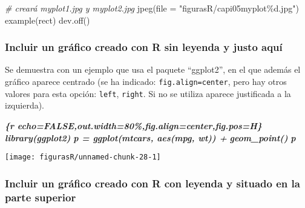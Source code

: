 \documentclass[12pt,a4paper,]{book}
\newenvironment{Shaded}{\begin{snugshade}}{\end{snugshade}}
\newcommand{\AttributeTok}[1]{\textcolor[rgb]{0.77,0.63,0.00}{#1}}
\newcommand{\CommentTok}[1]{\textcolor[rgb]{0.56,0.35,0.01}{\textit{#1}}}
\newcommand{\FunctionTok}[1]{\textcolor[rgb]{0.00,0.00,0.00}{#1}}
\newcommand{\InformationTok}[1]{\textcolor[rgb]{0.56,0.35,0.01}{\textbf{\textit{#1}}}}
\newcommand{\NormalTok}[1]{#1}
\newcommand{\StringTok}[1]{\textcolor[rgb]{0.31,0.60,0.02}{#1}}
\numberwithin{dummy}{section}
\theoremstyle{ocrenumbox}
\theoremstyle{blacknumex}
\theoremstyle{blacknumbox}
\theoremstyle{ocrenum}
\theoremstyle{ocrenum}
\begin{document}
\begin{Shaded}
\begin{Highlighting}[]
 \CommentTok{\# creará myplot1.jpg y myplot2.jpg}
\FunctionTok{jpeg}\NormalTok{(}\AttributeTok{file =} \StringTok{"figurasR/capi05myplot\%d.jpg"}\NormalTok{)}
\FunctionTok{example}\NormalTok{(rect)}
\FunctionTok{dev.off}\NormalTok{()}
\end{Highlighting}
\end{Shaded}

\hypertarget{incluir-un-gruxe1fico-creado-con-r-sin-leyenda-y-justo-aquuxed}{%
\subsubsection{Incluir un gráfico creado con R sin leyenda y justo
aquí}\label{incluir-un-gruxe1fico-creado-con-r-sin-leyenda-y-justo-aquuxed}}

Se demuestra con un ejemplo que usa el paquete ``ggplot2'', en el que
además el gráfico aparece centrado (se ha indicado:
\texttt{fig.align=\textquotesingle{}center\textquotesingle{}}, pero hay
otros valores para esta opción:
\texttt{\textquotesingle{}left\textquotesingle{}},
\texttt{\textquotesingle{}right\textquotesingle{}}. Si no se utiliza
aparece justificada a la izquierda).

\begin{Shaded}
\begin{Highlighting}[]
\InformationTok{\textasciigrave{}\textasciigrave{}\textasciigrave{}\{r echo=FALSE,out.width=\textquotesingle{}80\%\textquotesingle{},fig.align=\textquotesingle{}center\textquotesingle{},fig.pos=\textquotesingle{}H\textquotesingle{}\}}
\InformationTok{library(ggplot2)}
\InformationTok{p = ggplot(mtcars, aes(mpg, wt)) + }
\InformationTok{  geom\_point()}
\InformationTok{p  }
\InformationTok{\textasciigrave{}\textasciigrave{}\textasciigrave{}}
\end{Highlighting}
\end{Shaded}

\begin{center}\texttt{[image: figurasR/unnamed-chunk-28-1]} \end{center}

\hypertarget{incluir-un-gruxe1fico-creado-con-r-con-leyenda-y-situado-en-la-parte-superior}{%
\subsubsection{Incluir un gráfico creado con R con leyenda y situado en
la parte
superior}\label{incluir-un-gruxe1fico-creado-con-r-con-leyenda-y-situado-en-la-parte-superior}}
\end{document}
